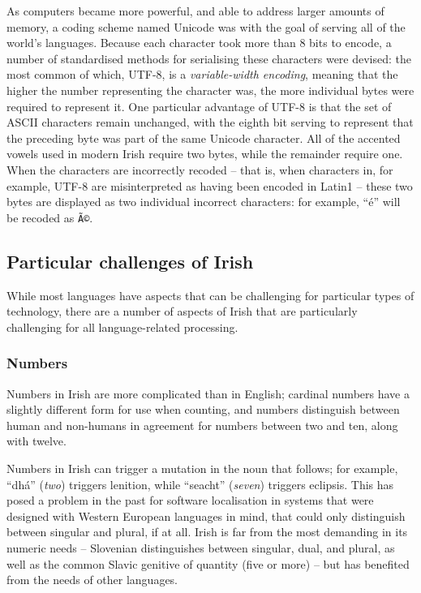 As computers became more powerful, and able to address larger amounts of memory, a coding scheme named Unicode was
with the goal of serving all of the world's languages. Because each character took more than 8 bits to encode,
a number of standardised methods for serialising these characters were devised: the most common of which, UTF-8,
is a \textit{variable-width encoding}, meaning that the higher the number representing the character was, the
more individual bytes were required to represent it. One particular advantage of UTF-8 is that the set of ASCII
characters remain unchanged, with the eighth bit serving to represent that the preceding byte was part of the
same Unicode character. All of the accented vowels used in modern Irish require two bytes, while the remainder
require one. When the characters are incorrectly recoded -- that is, when characters in, for example, UTF-8 are
misinterpreted as having been encoded in Latin1 -- these two bytes are displayed as two individual incorrect
characters: for example, ``{\'e}'' will be recoded as \texttt{Ã©}.


\subsection{Particular challenges of Irish}

While most languages have aspects that can be challenging for particular types of technology, there
are a number of aspects of Irish that are particularly challenging for all language-related processing.

\subsubsection{Numbers}

Numbers in Irish are more complicated than in English; cardinal numbers have a slightly different form
for use when counting, and numbers distinguish between human and non-humans in agreement for numbers
between two and ten, along with twelve.

Numbers in Irish can trigger a mutation in the noun that follows; for example, ``dh\'a'' (\textit{two})
triggers lenition, while ``seacht'' (\textit{seven}) triggers eclipsis. This has posed a problem in
the past for software localisation in systems that were designed with Western European languages in
mind, that could only distinguish between singular and plural, if at all. Irish is far from the most
demanding in its numeric needs -- Slovenian distinguishes between singular, dual, and plural, as well
as the common Slavic genitive of quantity (five or more) -- but has benefited from the needs of other
languages.


